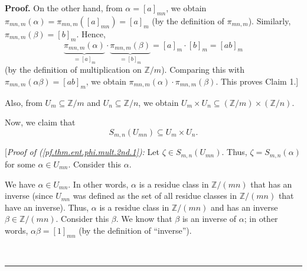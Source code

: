 \documentclass[numbers=enddot,12pt,final,onecolumn,notitlepage]{scrartcl}%
\numberwithin{exer}{subsection}
\theoremstyle{definition}
\newenvironment{proof}[1][Proof]{\noindent\textbf{#1.} }{\ \rule{0.5em}{0.5em}}
\begin{document}
\begin{proof}
On the other hand, from $\alpha=\left[  a\right]  _{mn}$, we obtain
$\pi_{mn,m}\left(  \alpha\right)  =\pi_{mn,m}\left(  \left[  a\right]
_{mn}\right)  =\left[  a\right]  _{m}$ (by the definition of $\pi_{mn,m}$).
Similarly, $\pi_{mn,m}\left(  \beta\right)  =\left[  b\right]  _{m}$. Hence,%
\[
\underbrace{\pi_{mn,m}\left(  \alpha\right)  }_{=\left[  a\right]  _{m}}%
\cdot\underbrace{\pi_{mn,m}\left(  \beta\right)  }_{=\left[  b\right]  _{m}%
}=\left[  a\right]  _{m}\cdot\left[  b\right]  _{m}=\left[  ab\right]  _{m}%
\]
(by the definition of multiplication on $\mathbb{Z}/m$). Comparing this with
$\pi_{mn,m}\left(  \alpha\beta\right)  =\left[  ab\right]  _{m}$, we obtain
$\pi_{mn,m}\left(  \alpha\right)  \cdot\pi_{mn,m}\left(  \beta\right)  $. This
proves Claim 1.]

Also, from $U_{m}\subseteq\mathbb{Z}/m$ and $U_{n}\subseteq\mathbb{Z}/n$, we
obtain $U_{m}\times U_{n}\subseteq\left(  \mathbb{Z}/m\right)  \times\left(
\mathbb{Z}/n\right)  $.

Now, we claim that%
\begin{equation}
S_{m,n}\left(  U_{mn}\right)  \subseteq U_{m}\times U_{n}.
\label{pf.thm.ent.phi.mult.2nd.1}%
\end{equation}


[\textit{Proof of (\ref{pf.thm.ent.phi.mult.2nd.1}):} Let $\zeta\in
S_{m,n}\left(  U_{mn}\right)  $. Thus, $\zeta=S_{m,n}\left(  \alpha\right)  $
for some $\alpha\in U_{mn}$. Consider this $\alpha$.

We have $\alpha\in U_{mn}$. In other words, $\alpha$ is a residue class in
$\mathbb{Z}/\left(  mn\right)  $ that has an inverse (since $U_{mn}$ was
defined as the set of all residue classes in $\mathbb{Z}/\left(  mn\right)  $
that have an inverse). Thus, $\alpha$ is a residue class in $\mathbb{Z}%
/\left(  mn\right)  $ and has an inverse $\beta\in\mathbb{Z}/\left(
mn\right)  $. Consider this $\beta$. We know that $\beta$ is an inverse of
$\alpha$; in other words, $\alpha\beta=\left[  1\right]  _{mn}$ (by the
definition of \textquotedblleft inverse\textquotedblright).


\end{proof}
\end{document}
